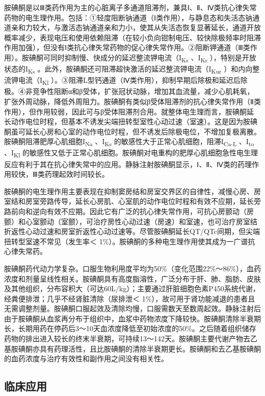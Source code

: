 胺碘酮是以Ⅲ类药作用为主的心脏离子多通道阻滞剂，兼具Ⅰ、Ⅱ、Ⅳ类抗心律失常药物的电生理作用。包括：①轻度阻断钠通道（Ⅰ类作用），与静息态和失活态钠通道亲和力较大，与激活态钠通道亲和力小，使其从失活态恢复显著延长，通道开放概率减少，表现电压和使用依赖阻滞（在较小负向钳制电压、较快除极频率时阻滞作用加强），但没有Ⅰ类抗心律失常药物的促心律失常作用。②阻断钾通道（Ⅲ类作用）。胺碘酮可同时抑制慢、快成分的延迟整流钾电流（I\textsubscript{Ks}
、I\textsubscript{Kr} ），特别是开放状态的I\textsubscript{Ks}
。此外，胺碘酮还可阻滞超快激活的延迟整流钾电流（I\textsubscript{Kur}
）和内向整流钾电流（I\textsubscript{Kl}
）。③阻滞L型钙通道（Ⅳ类作用），抑制早期后除极和延迟后除极。④非竞争性阻断α和β受体，扩张冠状动脉，增加其血流量，减少心肌耗氧，扩张外周动脉，降低外周阻力。胺碘酮有类似β受体阻滞剂的抗心律失常作用（Ⅱ类作用），但作用较弱，因此可与β受体阻滞剂合用。就整体电生理而言，胺碘酮延长动作电位时程，但基本不诱发尖端扭转型室性心动过速（室速）。这是因为胺碘酮虽可延长心房和心室的动作电位时程，但不诱发后除极电位，不增加复极离散。胺碘酮阻滞肥厚心肌细胞I\textsubscript{Na}
、I\textsubscript{Ks}
的敏感性大于正常心肌细胞，阻滞I\textsubscript{Ca-L}
、I\textsubscript{to} 、I\textsubscript{Kl}
的敏感性又低于正常心肌细胞。胺碘酮对电重构的肥厚心肌细胞急性电生理反应有利于其在抗心律失常中的应用。静脉注射胺碘酮显示，Ⅰ、Ⅱ、Ⅳ类的药理作用较快，Ⅲ类药理起效时间较长。

胺碘酮的电生理作用主要表现在抑制窦房结和房室交界区的自律性，减慢心房、房室结和房室旁路传导，延长心房肌、心室肌的动作电位时程和有效不应期，延长旁路前向和逆向有效不应期。因此它有广泛的抗心律失常作用，可抗心房颤动（房颤）和心室颤动（室颤），可治疗房性心动过速（房速）和室速，也可治疗房室结折返性心动过速和房室折返性心动过速等。尽管胺碘酮延长QT/QTc间期，但尖端扭转型室速不常见（发生率＜
1\%）。胺碘酮的多种电生理作用使其成为一广谱抗心律失常药。

胺碘酮药代动力学复杂。口服生物利用度平均为50\%（变化范围22\%～86\%），血药浓度和剂量呈线性相关。胺碘酮具有高度脂溶性，广泛分布于肝、肺、脂肪、皮肤及其他组织，分布容积大（可达60L/kg）；主要通过肝脏细胞色素P450系统代谢，经粪便排泄；几乎不经肾脏清除（尿排泄＜
1\%），故可用于肾功能减退的患者且无需调整剂量。胺碘酮口服起效及清除均慢，口服需数天至数周起效。静脉注射后由于胺碘酮从血浆再分布于组织中，血浆中药物浓度下降较快。胺碘酮清除半衰期长，长期用药在停药后3～10天血浓度降低至初始浓度的50\%。之后随着组织储存药物的排出进入较长的终末半衰期，可持续13～142天。胺碘酮主要代谢产物去乙基胺碘酮亦具有药理活性，且比胺碘酮的清除半衰期更长。胺碘酮和去乙基胺碘酮的血药浓度与治疗有效性和副作用之间没有相关性。

\subsection{临床应用}

